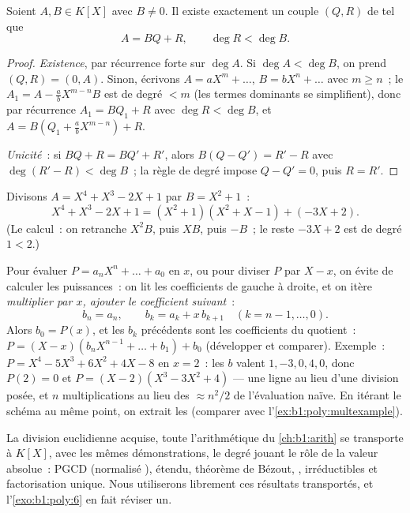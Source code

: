 \begin{theorem}\label{thm:b1:poly:division}
Soient $A, B \in K[X]$ avec $B \neq 0$. Il existe exactement un couple
$(Q, R)$ de  tel que
\[
A = BQ + R, \qquad \deg R < \deg B .
\]
\end{theorem}

\begin{proof}
\emph{Existence}, par récurrence forte sur $\deg A$. Si $\deg A < \deg
B$, on prend $(Q, R) = (0, A)$. Sinon, écrivons $A = a X^m + \dots$, $B
= b X^n + \dots$ avec $m \geq n$~; le  $A_1 = A - \frac ab
X^{m-n} B$ est de degré $< m$ (les termes dominants se simplifient),
donc par récurrence $A_1 = BQ_1 + R$ avec $\deg R < \deg B$, et $A =
B(Q_1 + \frac ab X^{m-n}) + R$.

\emph{Unicité}~: si $BQ + R = BQ' + R'$, alors $B(Q - Q') = R' - R$
avec $\deg(R' - R) < \deg B$~; la règle de degré impose $Q - Q' = 0$,
puis $R = R'$.
\end{proof}

\begin{example}\label{ex:b1:poly:division}
Divisons $A = X^4 + X^3 - 2X + 1$ par $B = X^2 + 1$~:
\[
X^4 + X^3 - 2X + 1 = (X^2 + 1)(X^2 + X - 1) + (-3X + 2).
\]
(Le calcul~: on retranche $X^2 B$, puis $X B$, puis $-B$~; le reste
$-3X + 2$ est de degré $1 < 2$.)
\end{example}

\begin{method}\label{met:b1:poly:horner}
Pour évaluer $P = a_nX^n + \dots + a_0$ en $x$, ou pour diviser $P$
par $X - x$, on évite de calculer les puissances~: on lit les
coefficients de gauche à droite, et on itère \emph{multiplier par
$x$, ajouter le coefficient suivant}~:
\[
b_n = a_n, \qquad b_{k} = a_{k} + x\,b_{k+1}
\quad (k = n-1, \dots, 0) .
\]
Alors $b_0 = P(x)$, et les $b_k$ précédents sont les coefficients du
quotient~: $P = (X - x)(b_nX^{n-1} + \dots + b_1) + b_0$ (développer
et comparer). Exemple~: $P = X^4 - 5X^3 + 6X^2 + 4X - 8$ en $x =
2$~: les $b$ valent $1, -3, 0, 4, 0$, donc $P(2) = 0$ et $P =
(X-2)(X^3 - 3X^2 + 4)$ --- une ligne au lieu d'une division posée,
et $n$ multiplications au lieu des $\approx n^2/2$ de l'évaluation
naïve. En itérant le schéma au même point, on extrait les
 (comparer avec l'\cref{ex:b1:poly:multexample}).
\end{method}

\begin{remark}[{Arithmétique de $K[X]$}]
La division euclidienne acquise, toute l'arithmétique du
\cref{ch:b1:arith} se transporte à $K[X]$, avec les mêmes
démonstrations, le degré jouant le rôle de la valeur absolue~: PGCD
(normalisé ),  étendu, théorème de Bézout,
,  irréductibles et factorisation unique. Nous
utiliserons librement ces résultats transportés, et
l'\cref{exo:b1:poly:6} en fait réviser un.
\end{remark}


